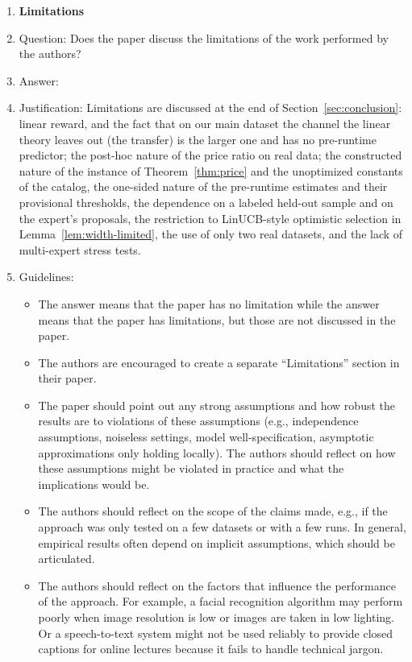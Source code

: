 \documentclass{article}
\theoremstyle{definition}
\theoremstyle{remark}
\theoremstyle{remark}
\begin{document}
\begin{enumerate}
\item {\bf Limitations}
    \item[] Question: Does the paper discuss the limitations of the work performed by the authors?
    \item[] Answer: \answerYes{} %
    \item[] Justification: Limitations are discussed at the end of Section~\ref{sec:conclusion}: linear reward, and the fact that on our main dataset the channel the linear theory leaves out (the transfer) is the larger one and has no pre-runtime predictor; the post-hoc nature of the price ratio on real data; the constructed nature of the instance of Theorem~\ref{thm:price} and the unoptimized constants of the catalog, the one-sided nature of the pre-runtime estimates and their provisional thresholds, the dependence on a labeled held-out sample and on the expert's proposals, the restriction to LinUCB-style optimistic selection in Lemma~\ref{lem:width-limited}, the use of only two real datasets, and the lack of multi-expert stress tests.
    \item[] Guidelines:
    \begin{itemize}
        \item The answer \answerNA{} means that the paper has no limitation while the answer \answerNo{} means that the paper has limitations, but those are not discussed in the paper. 
        \item The authors are encouraged to create a separate ``Limitations'' section in their paper.
        \item The paper should point out any strong assumptions and how robust the results are to violations of these assumptions (e.g., independence assumptions, noiseless settings, model well-specification, asymptotic approximations only holding locally). The authors should reflect on how these assumptions might be violated in practice and what the implications would be.
        \item The authors should reflect on the scope of the claims made, e.g., if the approach was only tested on a few datasets or with a few runs. In general, empirical results often depend on implicit assumptions, which should be articulated.
        \item The authors should reflect on the factors that influence the performance of the approach. For example, a facial recognition algorithm may perform poorly when image resolution is low or images are taken in low lighting. Or a speech-to-text system might not be used reliably to provide closed captions for online lectures because it fails to handle technical jargon.

\end{itemize}
\end{enumerate}
\end{document}
